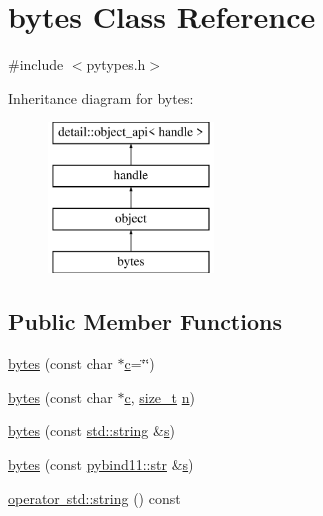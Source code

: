 \hypertarget{classbytes}{}\section{bytes Class Reference}
\label{classbytes}


{\ttfamily \#include $<$pytypes.\+h$>$}

Inheritance diagram for bytes\+:\begin{figure}[H]
\begin{center}
\leavevmode
\includegraphics[height=4.000000cm]{classbytes}
\end{center}
\end{figure}
\subsection*{Public Member Functions}
\begin{DoxyCompactItemize}
\item 
\mbox{\hyperlink{classbytes_a61beb3470b0464c351a2d8e4cd892691}{bytes}} (const char $\ast$\mbox{\hyperlink{_s_d_l__opengl__glext_8h_a1f2d7f8147412c43ba2303a56f97ee73}{c}}=\char`\"{}\char`\"{})
\item 
\mbox{\hyperlink{classbytes_a8205f27ee2cd267771e4bc304baf44db}{bytes}} (const char $\ast$\mbox{\hyperlink{_s_d_l__opengl__glext_8h_a1f2d7f8147412c43ba2303a56f97ee73}{c}}, \mbox{\hyperlink{detail_2common_8h_a801d6a451a01953ef8cbae6feb6a3638}{size\+\_\+t}} \mbox{\hyperlink{_s_d_l__opengl__glext_8h_ae2b4646468bc89d0ba646f5cf838e051}{n}})
\item 
\mbox{\hyperlink{classbytes_a39cb6d38b9530c023063852b013ecf50}{bytes}} (const \mbox{\hyperlink{_s_d_l__opengl__glext_8h_ab4ccfaa8ab0e1afaae94dc96ef52dde1}{std\+::string}} \&\mbox{\hyperlink{_s_d_l__opengl_8h_a4af680a6c683f88ed67b76f207f2e6e4}{s}})
\item 
\mbox{\hyperlink{group__pytypes_ga7315ac2686b4e6120790815f31e28edc}{bytes}} (const \mbox{\hyperlink{node_8h_a62b34ca1362fe946082b7aa0cd9be844}{pybind11\+::str}} \&\mbox{\hyperlink{_s_d_l__opengl_8h_a4af680a6c683f88ed67b76f207f2e6e4}{s}})
\item 
\mbox{\hyperlink{classbytes_a5e71a0d3b0f90c4859ca60b93c24f89f}{operator std\+::string}} () const
\end{DoxyCompactItemize}
